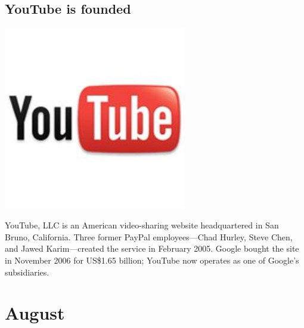 \documentclass[11pt]{report}
\begin{document}
\subsection{YouTube is founded}
\begin{center}\includegraphics[width=8cm]{./img/youtube.jpg}\end{center}
YouTube, LLC is an American video-sharing website headquartered in San Bruno, California. Three former PayPal employees—Chad Hurley, Steve Chen, and Jawed Karim—created the service in February 2005. Google bought the site in November 2006 for US\$1.65 billion; YouTube now operates as one of Google's subsidiaries.

\section{August}
\end{document}

